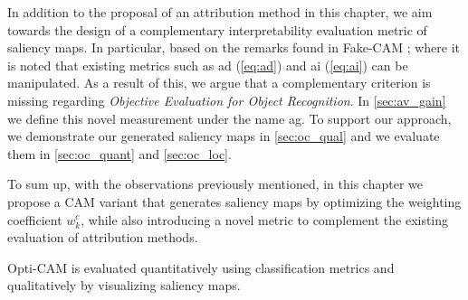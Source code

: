 \noindent In addition to the proposal of an attribution method in this chapter, we aim towards the 
design of a complementary interpretability evaluation metric of saliency maps. In particular, 
based on the remarks found in Fake-CAM \autocite{poppi2021revisiting}; where it is noted that 
existing metrics such as \gls{ad} (\ref{eq:ad}) and \gls{ai} (\ref{eq:ai}) can be manipulated. As a 
result of this, we argue that a complementary criterion is missing regarding \textit{Objective 
Evaluation for Object Recognition}. In \autoref{sec:av_gain} we define this novel measurement 
under the name \gls{ag}. To support our approach, we demonstrate our generated saliency maps in 
\autoref{sec:oc_qual} and we evaluate them in \autoref{sec:oc_quant} and \autoref{sec:oc_loc}.

\noindent To sum up, with the observations previously mentioned, in this chapter we propose a CAM 
variant that generates saliency maps by optimizing the weighting coefficient $w_k^c$, while also 
introducing a novel metric to complement the existing evaluation of attribution methods.\\


\newpage

\newpage

\newpage
Opti-CAM is evaluated quantitatively using classification metrics and qualitatively by visualizing
 saliency maps.

\newpage

\newpage








